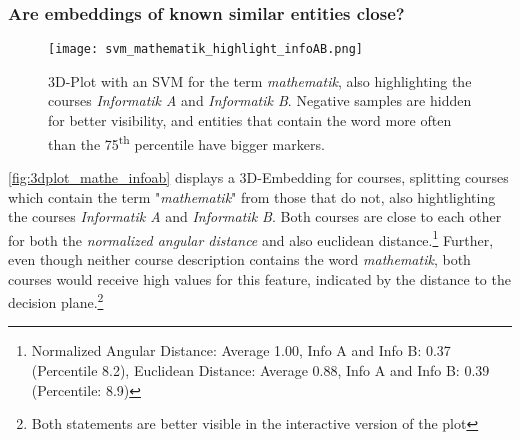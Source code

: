 

\subsubsection{Are embeddings of known similar entities close?}

\begin{figure}[H]
	\centering
	\texttt{[image: svm\_mathematik\_highlight\_infoAB.png]}
	\caption[3D-Plot with an SVM for the term \textit{mathematik}.]{
		\label{fig:3dplot_mathe_infoab}
		3D-Plot with an SVM for the term \textit{mathematik}, also highlighting the courses \textit{Informatik A} and \textit{Informatik B}. Negative samples are hidden for better visibility, and entities that contain the word more often than the 75\textsuperscript{th} percentile have bigger markers.
	}
\end{figure}

\autoref{fig:3dplot_mathe_infoab} displays a 3D-Embedding for courses, splitting courses which contain the term "\textit{mathematik}" from those that do not, also hightlighting the courses \textit{Informatik A} and \textit{Informatik B}. Both courses are close to each other for both the \textit{normalized angular distance} and also euclidean distance.\footnote{Normalized Angular Distance: Average 1.00, Info A and Info B: 0.37 (Percentile 8.2), Euclidean Distance: Average 0.88, Info A and Info B: 0.39 (Percentile: 8.9)}
Further, even though neither course description contains the word \textit{mathematik}, both courses would receive high values for this feature, indicated by the distance to the decision plane.\footnote{Both statements are better visible in the interactive version of the plot}

